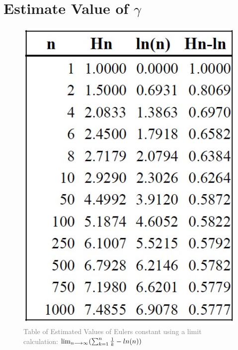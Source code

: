 \documentclass{article}
\newcommand{\lra}{\ensuremath\longrightarrow}
\begin{document}
\section{Estimate Value of $\gamma$}
\FloatBarrier
\begin{figure}[htp]
    \centering
    \includegraphics[scale=0.5]{Table of Euler Gamma Values more values.jpg}
    \caption{\textcolor{gray}{Table of Estimated Values of Eulers constant using a limit calculation: $\lim_{n\lra\infty}(\sum_{k=1}^{n}\frac{1}{k}-ln(n))$}}
    \label{fig:galaxy}
\end{figure}
\FloatBarrier
\end{document}
